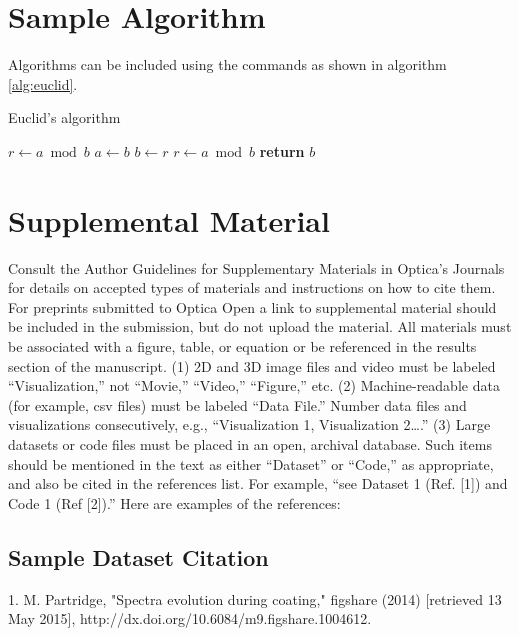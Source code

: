 \documentclass[9pt,twocolumn,twoside]{osajnl}
\begin{document}
\section{Sample Algorithm}

Algorithms can be included using the commands as shown in algorithm \ref{alg:euclid}.

\begin{algorithm}
\caption{Euclid’s algorithm}\label{alg:euclid}
\begin{algorithmic}[1]
\State $r\gets a\bmod b$
\State $a\gets b$
\State $b\gets r$
\State $r\gets a\bmod b$
\EndWhile\label{euclidendwhile}
\State \textbf{return} $b$
\EndProcedure
\end{algorithmic}
\end{algorithm}

\section{Supplemental Material}

Consult the Author Guidelines for Supplementary Materials in Optica's Journals for details on accepted types of materials and instructions on how to cite them. For preprints submitted to Optica Open a link to supplemental material should be included in the submission, but do not upload the material.
All materials must be associated with a figure, table, or equation or be referenced in the results section of the manuscript.
(1) 2D and 3D image files and video must be labeled “Visualization,” not “Movie,” “Video,” “Figure,” etc.
(2) Machine-readable data (for example, csv files) must be labeled  “Data File.”  Number data files and visualizations consecutively, e.g., “Visualization 1, Visualization 2….”
(3) Large datasets or code files must be placed in an open, archival database.  Such items should be mentioned in the text as either “Dataset” or “Code,” as appropriate, and also be cited in the references list.  For example, “see Dataset 1 (Ref. [1]) and Code 1 (Ref [2]).” Here are examples of the references:

\subsection{Sample Dataset Citation}

1. M. Partridge, "Spectra evolution during coating," figshare (2014) [retrieved 13 May 2015], http://dx.doi.org/10.6084/m9.figshare.1004612.
\end{document}
